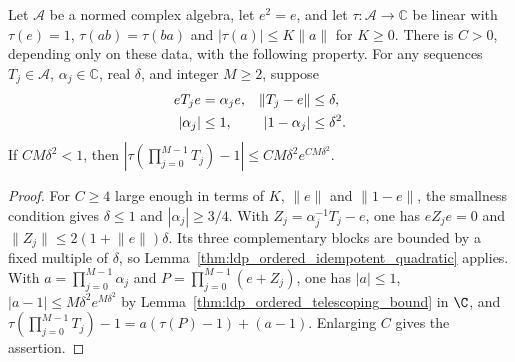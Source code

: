 \begin{lemma}
    \label{thm:ldp_ordered_compression_quadratic}
    \leanok
    Let $\mathcal A$ be a normed complex algebra, let $e^2=e$, and let
    $\tau:\mathcal A\to\mathbb C$ be linear with $\tau(e)=1$,
    $\tau(ab)=\tau(ba)$ and $|\tau(a)|\le K\lVert a\rVert$ for $K\ge0$.
    There is $C>0$, depending only on these data, with the following
    property. For any sequences $T_j\in\mathcal A$, $\alpha_j\in\mathbb C$,
    real $\delta$, and integer $M\ge2$, suppose
    \begin{align}
        eT_je      & =\alpha_je, & \lVert T_j-e\rVert & \le\delta, \notag \\
        |\alpha_j| & \le1,       & |1-\alpha_j|       & \le\delta^2.
        \label{eq:ldp_ordered_scalar_compression}
    \end{align}
    If $CM\delta^2<1$, then
    $\left|\tau(\prod_{j=0}^{M-1}T_j)-1\right|
        \le CM\delta^2e^{CM\delta^2}$.
\end{lemma}
\begin{proof}\leanok
    For $C\ge4$ large enough in terms of $K$, $\lVert e\rVert$ and
    $\lVert1-e\rVert$, the smallness condition gives
    $\delta\le1$ and $|\alpha_j|\ge3/4$. With
    $Z_j=\alpha_j^{-1}T_j-e$, one has $eZ_je=0$ and
    $\lVert Z_j\rVert\le2(1+\lVert e\rVert)\delta$.
    Its three complementary blocks are bounded by a fixed multiple of
    $\delta$, so Lemma~\ref{thm:ldp_ordered_idempotent_quadratic} applies.
    With $a=\prod_{j=0}^{M-1}\alpha_j$ and
    $P=\prod_{j=0}^{M-1}(e+Z_j)$, one has $|a|\le1$,
    $|a-1|\le M\delta^2e^{M\delta^2}$ by
    Lemma~\ref{thm:ldp_ordered_telescoping_bound} in $\C$, and
    $\tau(\prod_{j=0}^{M-1}T_j)-1=a(\tau(P)-1)+(a-1)$.
    Enlarging $C$ gives the assertion.
\end{proof}
